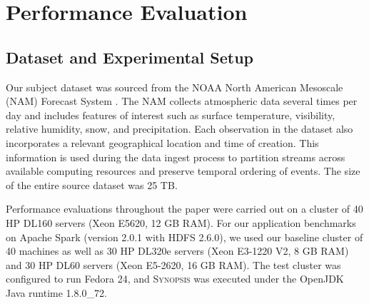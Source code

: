\section{Performance Evaluation}
\label{sec:performance}
\subsection{Dataset and Experimental Setup}
Our subject dataset was sourced from the NOAA North American Mesoscale (NAM) Forecast System \cite{noaa_nam}.  The NAM collects atmospheric data several times per day and includes features of interest such as surface temperature, visibility, relative humidity, snow, and precipitation. Each observation in the dataset also incorporates a relevant geographical location and time of creation. This information is used during the data ingest process to partition streams across available computing resources and preserve temporal ordering of events. The size of the entire source dataset was 25 TB.

Performance evaluations throughout the paper were carried out on a cluster of 40 HP DL160 servers (Xeon E5620, 12 GB RAM). For our application benchmarks on Apache Spark (version 2.0.1 with HDFS 2.6.0), we used our baseline cluster of 40 machines as well as 30 HP DL320e servers (Xeon E3-1220 V2, 8 GB RAM) and 30 HP DL60 servers (Xeon E5-2620, 16 GB RAM). The test cluster was configured to run Fedora 24, and \textsc{Synopsis} was executed under the OpenJDK Java runtime 1.8.0\_72.

